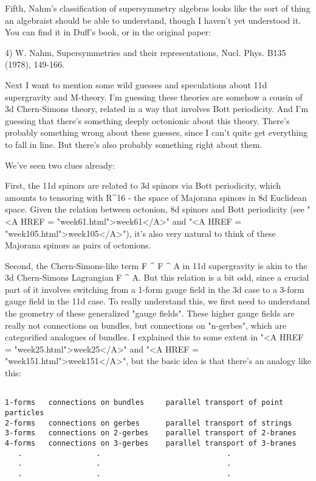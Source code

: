 Fifth, Nahm's classification of supersymmetry algebras looks like the 
sort of thing an algebraist should be able to understand, though I 
haven't yet understood it.  You can find it in Duff's book, or in the 
original paper:  
 
4) W. Nahm, Supersymmetries and their representations, Nucl. Phys. 
B135 (1978), 149-166. 
 
Next I want to mention some wild guesses and speculations about 11d  
supergravity and M-theory.  I'm guessing these theories are somehow 
a cousin of 3d Chern-Simons theory, related in a way that involves 
Bott periodicity.  And I'm guessing that there's something deeply 
octonionic about this theory.  There's probably something wrong about
these guesses, since I can't quite get everything to fall in line.
But there's also probably something right about them.
 
We've seen two clues already: 
 
First, the 11d spinors are related to 3d spinors via Bott periodicity,
which amounts to tensoring with R^{16} - the space of Majorana spinors
in 8d Euclidean space.  Given the relation between octonion, 8d spinors
and Bott periodicity (see "<A HREF = "week61.html">week61</A>"
and "<A HREF = "week105.html">week105</A>"), it's also very
natural to think of these Majorana spinors as pairs of octonions.
 
Second, the Chern-Simons-like term F ^ F ^ A in 11d supergravity is akin
to the 3d Chern-Simons Lagrangian F ^ A.  But this relation is a bit
odd, since a crucial part of it involves switching from a 1-form gauge
field in the 3d case to a 3-form gauge field in the 11d case.  To really
understand this, we first need to understand the geometry of these
generalized "gauge fields".  These higher gauge fields are
really not connections on bundles, but connections on
"n-gerbes", which are categorified analogues of bundles.  I
explained this to some extent in "<A HREF =
"week25.html">week25</A>" and "<A HREF =
"week151.html">week151</A>", but the basic idea is that there's an
analogy like this:
 

\begin{verbatim}

1-forms   connections on bundles     parallel transport of point particles 
2-forms   connections on gerbes      parallel transport of strings 
3-forms   connections on 2-gerbes    parallel transport of 2-branes 
4-forms   connections on 3-gerbes    parallel transport of 3-branes 
   .                 .                             . 
   .                 .                             . 
   .                 .                             . 
 
\end{verbatim}
    
